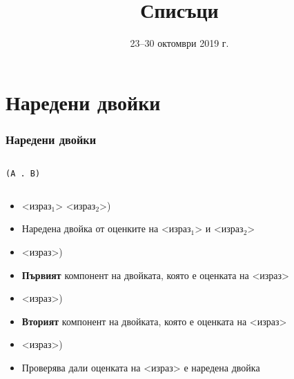 \documentclass[alsotrans]{beamerswitch}
\title{Списъци}
\date{23--30 октомври 2019 г.}
\begin{document}
\begin{frame}
  \titlepage
\end{frame}

\section{Наредени двойки}

\begin{frame}
  \frametitle{Наредени двойки}

  \begin{columns}[t,onlytextwidth]
    \begin{column}{.5\textwidth}
      \vspace{2ex}
      \begin{center}
        \tt{(A . B)}
      \end{center}
    \end{column}
    \begin{column}{.5\textwidth}
      \begin{center}
      \end{center}
    \end{column}
  \end{columns}
  \pause
  \vspace{2ex}
  \begin{itemize}[<+->]
  \item {} <израз$_1$> <израз$_2$>\tta)
  \item Наредена двойка от оценките на <израз$_1$> и <израз$_2$>
  \item {} <израз>\tta)
  \item \textbf{Първият} компонент на двойката, която е оценката на <израз>
  \item {} <израз>\tta)
  \item \textbf{Вторият} компонент на двойката, която е оценката на <израз>
  \item {}   <израз>\tta)
  \item Проверява дали оценката на <израз> е наредена двойка
  \end{itemize}
\end{frame}
\end{document}
